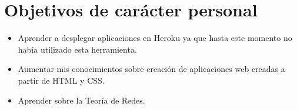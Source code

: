\section{Objetivos de carácter personal}
\begin{itemize}
    \item Aprender a desplegar aplicaciones en Heroku ya que hasta este momento no había utilizado esta herramienta.
    \item Aumentar mis conocimientos sobre creación de aplicaciones web creadas a partir de HTML y CSS.
    \item Aprender sobre la Teoría de Redes.
\end{itemize}